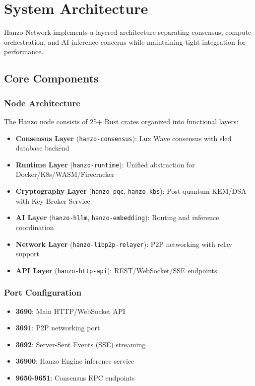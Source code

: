 \section{System Architecture}


Hanzo Network implements a layered architecture separating consensus, compute orchestration, and AI inference concerns while maintaining tight integration for performance.

\subsection{Core Components}

\subsubsection{Node Architecture}

The Hanzo node consists of 25+ Rust crates organized into functional layers:

\begin{itemize}
\item \textbf{Consensus Layer} (\texttt{hanzo-consensus}): Lux Wave consensus with sled database backend
\item \textbf{Runtime Layer} (\texttt{hanzo-runtime}): Unified abstraction for Docker/K8s/WASM/Firecracker
\item \textbf{Cryptography Layer} (\texttt{hanzo-pqc}, \texttt{hanzo-kbs}): Post-quantum KEM/DSA with Key Broker Service
\item \textbf{AI Layer} (\texttt{hanzo-hllm}, \texttt{hanzo-embedding}): Routing and inference coordination
\item \textbf{Network Layer} (\texttt{hanzo-libp2p-relayer}): P2P networking with relay support
\item \textbf{API Layer} (\texttt{hanzo-http-api}): REST/WebSocket/SSE endpoints
\end{itemize}

\subsubsection{Port Configuration}

\begin{itemize}
\item \textbf{3690}: Main HTTP/WebSocket API
\item \textbf{3691}: P2P networking port
\item \textbf{3692}: Server-Sent Events (SSE) streaming
\item \textbf{36900}: Hanzo Engine inference service
\item \textbf{9650-9651}: Consensus RPC endpoints
\end{itemize}

